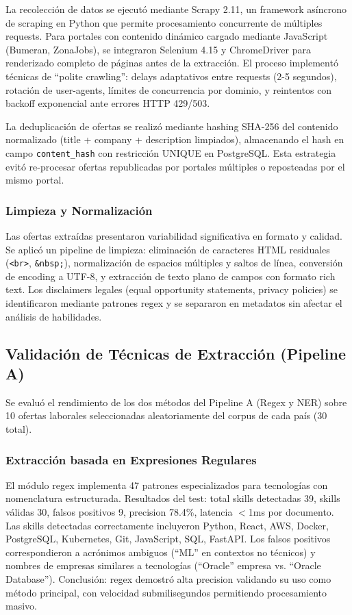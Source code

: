 La recolección de datos se ejecutó mediante Scrapy 2.11, un framework asíncrono de scraping en Python que permite procesamiento concurrente de múltiples requests. Para portales con contenido dinámico cargado mediante JavaScript (Bumeran, ZonaJobs), se integraron Selenium 4.15 y ChromeDriver para renderizado completo de páginas antes de la extracción. El proceso implementó técnicas de ``polite crawling'': delays adaptativos entre requests (2-5 segundos), rotación de user-agents, límites de concurrencia por dominio, y reintentos con backoff exponencial ante errores HTTP 429/503.

La deduplicación de ofertas se realizó mediante hashing SHA-256 del contenido normalizado (title + company + description limpiados), almacenando el hash en campo \texttt{content\_hash} con restricción UNIQUE en PostgreSQL. Esta estrategia evitó re-procesar ofertas republicadas por portales múltiples o reposteadas por el mismo portal.

\subsubsection{Limpieza y Normalización}

Las ofertas extraídas presentaron variabilidad significativa en formato y calidad. Se aplicó un pipeline de limpieza: eliminación de caracteres HTML residuales (\texttt{<br>}, \texttt{\&nbsp;}), normalización de espacios múltiples y saltos de línea, conversión de encoding a UTF-8, y extracción de texto plano de campos con formato rich text. Los disclaimers legales (equal opportunity statements, privacy policies) se identificaron mediante patrones regex y se separaron en metadatos sin afectar el análisis de habilidades.

\subsection{Validación de Técnicas de Extracción (Pipeline A)}

Se evaluó el rendimiento de los dos métodos del Pipeline A (Regex y NER) sobre 10 ofertas laborales seleccionadas aleatoriamente del corpus de cada país (30 total).

\subsubsection{Extracción basada en Expresiones Regulares}

El módulo regex implementa 47 patrones especializados para tecnologías con nomenclatura estructurada. Resultados del test: total skills detectadas 39, skills válidas 30, falsos positivos 9, precision 78.4\%, latencia $<$1ms por documento. Las skills detectadas correctamente incluyeron Python, React, AWS, Docker, PostgreSQL, Kubernetes, Git, JavaScript, SQL, FastAPI. Los falsos positivos correspondieron a acrónimos ambiguos (``ML'' en contextos no técnicos) y nombres de empresas similares a tecnologías (``Oracle'' empresa vs. ``Oracle Database''). Conclusión: regex demostró alta precision validando su uso como método principal, con velocidad submilisegundos permitiendo procesamiento masivo.

